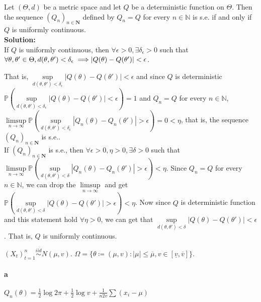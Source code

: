 \documentclass[11pt,letterpaper]{article}                  %
\begin{document}
\bigskip
\begin{problem} Let $(\Theta, d)$ be a metric space and let $Q$ be a deterministic function on $\Theta$. Then the sequence $(Q_n)_{n \in \mathbf{N}}$ defined by $Q_n = Q$ for every $n \in \mathbb{N}$ is s.e. if and only if $Q$ is uniformly continuous.\\
	
	\textbf{Solution:} \\
	
	If $Q$ is uniformly continuous, then $\forall \epsilon > 0, \exists \delta_\epsilon > 0$ such that $\forall \theta, \theta' \in \Theta, d(\theta, \theta') < \delta_\epsilon \implies \\ |Q(\theta) - Q(\theta')| < \epsilon$.
	
	That is, $\sup\limits_{d(\theta, \theta') < \delta_\epsilon} |Q(\theta) - Q(\theta')| < \epsilon$ and since $Q$ is deterministic $\mathbb{P} (\sup\limits_{d(\theta, \theta') < \delta_\epsilon} |Q(\theta) - Q(\theta')| < \epsilon) = 1$ and $Q_n = Q$ for every $n \in \mathbb{N}$,  $ \limsup\limits_{n \rightarrow \infty} \mathbb{P} (\sup\limits_{d(\theta, \theta') < \delta_\epsilon} |Q_n(\theta) - Q_n(\theta')| > \epsilon) = 0 < \eta$, that is, the sequence $(Q_n)_{n \in \mathbf{N}}$ is s.e..  \\
	
	If  $(Q_n)_{n \in \mathbf{N}}$ is s.e., then    $ \forall \epsilon > 0, \eta > 0, \exists \delta > 0$ such that $\limsup\limits_{n \rightarrow \infty} \mathbb{P} (\sup\limits_{d(\theta, \theta') < \delta} |Q_n(\theta) - Q_n(\theta')| > \epsilon) < \eta$. Since  $Q_n = Q$ for every $n \in \mathbb{N}$, we can drop the $\limsup\limits_{n \rightarrow \infty}$ and get \\ $\mathbb{P} (\sup\limits_{d(\theta, \theta') < \delta} |Q(\theta) - Q(\theta')| > \epsilon) < \eta$. Now since $Q$ is deterministic function and this statement hold $\forall \eta > 0$, we can get that $\sup\limits_{d(\theta, \theta') < \delta} |Q(\theta) - Q(\theta')| < \epsilon$. That is, $Q$ is uniformly continuous.  
\end{problem}

\bigskip
\begin{problem}
$(X_t)_{t=1}^{n} \overset{iid}{\sim} N(\mu, v) $. $\Omega = \{ \theta
\coloneqq (\mu,
v): |\mu| \le \overline{\mu}, v \in [\underline{v}, \overline{v}]\}$.
\paragraph*{a}
$Q_n(\theta) = \tfrac{1}{2}\log 2\pi + \tfrac{1}{2} \log v +
\tfrac{1}{n2v} \sum(x_i - \mu)$
\end{problem}
\end{document}
